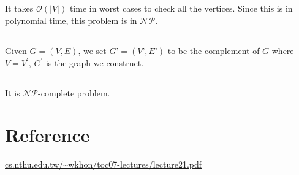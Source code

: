 \documentclass[12pt,a4paper]{article}
\theoremstyle{definition}
\begin{document}
\subsection{}
It takes $\mathcal{O}(\left| V \right|)$ time in worst cases to check all the vertices. Since this is in polynomial time, this problem is in $\mathcal{NP}$.
\subsection{}
Given $G=(V,E)$, we set $G’=(V’,E’)$ to be the complement of $G$ where $V=V^{'}$, $G^{'}$ is the graph we construct.
\subsection{}
It is $\mathcal{NP}$-complete problem.
\section*{Reference}
{\noindent [1] \url{cs.nthu.edu.tw/~wkhon/toc07-lectures/lecture21.pdf}}
\end{document}
